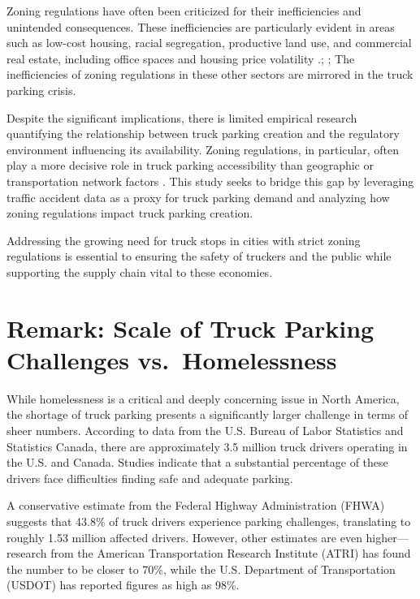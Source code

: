 \documentclass[
  12pt]{article}
\begin{document}
Zoning regulations have often been criticized for their inefficiencies
and unintended consequences. These inefficiencies are particularly
evident in areas such as low-cost housing, racial segregation,
productive land use, and commercial real estate, including office spaces
and housing price volatility
\citet{glaeserImpactBuildingRestrictions2003}.;
\citet{galeReviewColorLaw2019}; \citet{PDFTriumphCity2024} The
inefficiencies of zoning regulations in these other sectors are mirrored
in the truck parking crisis.

Despite the significant implications, there is limited empirical
research quantifying the relationship between truck parking creation and
the regulatory environment influencing its availability. Zoning
regulations, in particular, often play a more decisive role in truck
parking accessibility than geographic or transportation network factors
\citep{shertzerZoningEconomicGeography2018}. This study seeks to bridge
this gap by leveraging traffic accident data as a proxy for truck
parking demand and analyzing how zoning regulations impact truck parking
creation.

Addressing the growing need for truck stops in cities with strict zoning
regulations is essential to ensuring the safety of truckers and the
public while supporting the supply chain vital to these economies.

\hypertarget{remark-scale-of-truck-parking-challenges-vs.-homelessness}{%
\section{Remark: Scale of Truck Parking Challenges
vs.~Homelessness}\label{remark-scale-of-truck-parking-challenges-vs.-homelessness}}

While homelessness is a critical and deeply concerning issue in North
America, the shortage of truck parking presents a significantly larger
challenge in terms of sheer numbers. According to data from the U.S.
Bureau of Labor Statistics and Statistics Canada, there are
approximately 3.5 million truck drivers operating in the U.S. and
Canada. Studies indicate that a substantial percentage of these drivers
face difficulties finding safe and adequate parking.

A conservative estimate from the Federal Highway Administration (FHWA)
suggests that 43.8\% of truck drivers experience parking challenges,
translating to roughly 1.53 million affected drivers. However, other
estimates are even higher---research from the American Transportation
Research Institute (ATRI) has found the number to be closer to 70\%,
while the U.S. Department of Transportation (USDOT) has reported figures
as high as 98\%.
\end{document}
